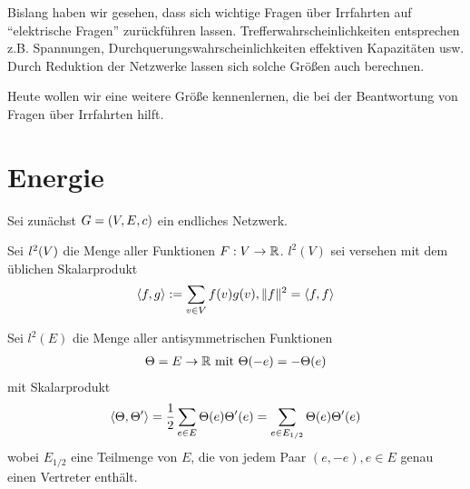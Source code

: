 Bislang haben wir gesehen, dass sich wichtige Fragen über Irrfahrten auf \enquote{elektrische Fragen} zurückführen lassen. Trefferwahrscheinlichkeiten entsprechen z.B. Spannungen, Durchquerungswahrscheinlichkeiten effektiven Kapazitäten usw. 
Durch Reduktion der Netzwerke lassen sich solche Größen auch berechnen. 

Heute wollen wir eine weitere Größe kennenlernen, die bei der Beantwortung von Fragen über Irrfahrten hilft.

\section{Energie}
\label{chap:Energie}
Sei zunächst $G = \left(V,E,c\right)$ ein endliches Netzwerk.
\begin{definition}
	Sei $l^2\enb{V}$ die Menge aller Funktionen $F: V \to \mathbb{R}$. $l^2(V)$ sei versehen mit dem üblichen Skalarprodukt 
	\begin{gather}
		\langle f,g\rangle := \sum\limits_{v \in V} f(v)g(v), \lVert f\rVert^2 = \langle f,f\rangle
	\end{gather}	
\end{definition}
\begin{definition}
	Sei $l^2(E)$ die Menge aller antisymmetrischen Funktionen 
	\begin{gather}
		\Theta = E \to \mathbb{R} \text{ mit } \Theta(-e) = -\Theta(e)
	\end{gather}
	mit Skalarprodukt 
	\begin{gather}
		\langle\Theta,\Theta'\rangle = \frac{1}{2}\sum\limits_{e \in E} \Theta(e) \Theta'(e) = \sum\limits_{e \in E_{1/2}} \Theta(e)\Theta'(e)
	\end{gather}
	wobei $E_{1/2}$ eine Teilmenge von $E$, die von jedem Paar $(e,-e), e \in E$ genau einen Vertreter enthält.
\end{definition}

